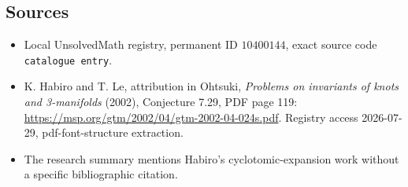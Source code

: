 \documentclass[11pt]{article}
\begin{document}
\subsection{Sources}
\begin{itemize}
\item Local UnsolvedMath registry, permanent ID \(10400144\), exact source code \texttt{catalogue entry}.
\item K. Habiro and T. Le, attribution in Ohtsuki, \emph{Problems on invariants of knots and 3-manifolds} (2002), Conjecture 7.29, PDF page 119: \url{https://msp.org/gtm/2002/04/gtm-2002-04-024s.pdf}. Registry access 2026-07-29, pdf-font-structure extraction.
\item The research summary mentions Habiro's cyclotomic-expansion work without a specific bibliographic citation.
\end{itemize}
\end{document}
